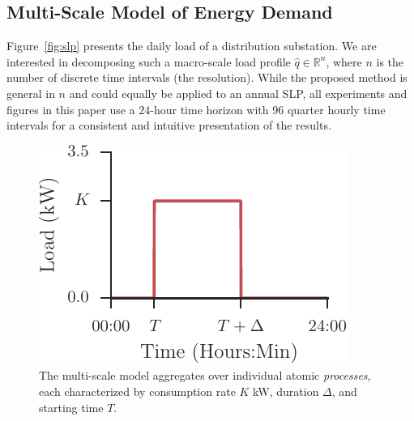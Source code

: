 \documentclass[conference]{IEEEtran}
\begin{document}
\subsection{Multi-Scale Model of Energy Demand}\label{sec:LoadProfilesDecomposition}

Figure~\ref{fig:slp} presents the daily load of a distribution substation. We are interested in decomposing such a macro-scale load profile $\hat{q} \in \mathbb{R}^n$, where $n$ is the number of discrete time intervals (the resolution). While the proposed method is general in $n$ and could equally be applied to an annual SLP, all experiments and figures in this paper use a $24$-hour time horizon with 96 quarter hourly time intervals for a consistent and intuitive presentation of the results.

\begin{figure}[!b]
\centering
\includegraphics[width=0.5\columnwidth]{figures/process.pdf}
\caption{The multi-scale model aggregates over individual atomic \emph{processes}, each characterized by consumption rate $K$ kW, duration $\Delta$, and starting time $T$.}
\vspace{-0.4cm}
\label{fig:process}
\end{figure}
\end{document}
